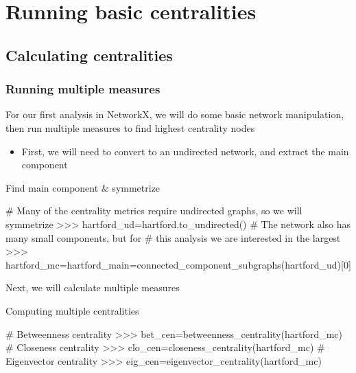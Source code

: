 \documentclass[xcolor=dvipsnames, 9pt]{beamer}
\newenvironment{code}{\begin{semiverbatim} \begin{footnotesize}}
{\end{footnotesize}\end{semiverbatim}}
\begin{document}


\section{Running basic centralities} %
\label{sec:running_basic_centralities}

\subsection{Calculating centralities} %
\label{sub:calculating_centralities}

\begin{frame}[fragile]
    \frametitle{Running multiple measures}
    For our first analysis in NetworkX, we will do some basic network manipulation, then run multiple measures to find highest centrality nodes
    \begin{itemize}
        \item First, we will need to convert to an undirected network, and extract the main component
    \end{itemize}
    \begin{block}{Find main component \& symmetrize}
        \begin{code}
# Many of the centrality metrics require undirected graphs, so we will symmetrize
>>> \alert<2>{hartford_ud=hartford.to_undirected()}
# The network also has many small components, but for
# this analysis we are interested in the largest
>>> \alert<3>{hartford_mc=hartford_main=connected_component_subgraphs(hartford_ud)[0]}
        \end{code}
    \end{block}
    Next, we will calculate multiple measures
    \begin{block}{Computing multiple centralities}
        \begin{code}
# Betweenness centrality
>>> \alert<4>{bet_cen=betweenness_centrality(hartford_mc)}
# Closeness centrality
>>> \alert<4>{clo_cen=closeness_centrality(hartford_mc)}
# Eigenvector centrality
>>> \alert<4>{eig_cen=eigenvector_centrality(hartford_mc)}
        \end{code}
    \end{block}
\end{frame}
\end{document}

